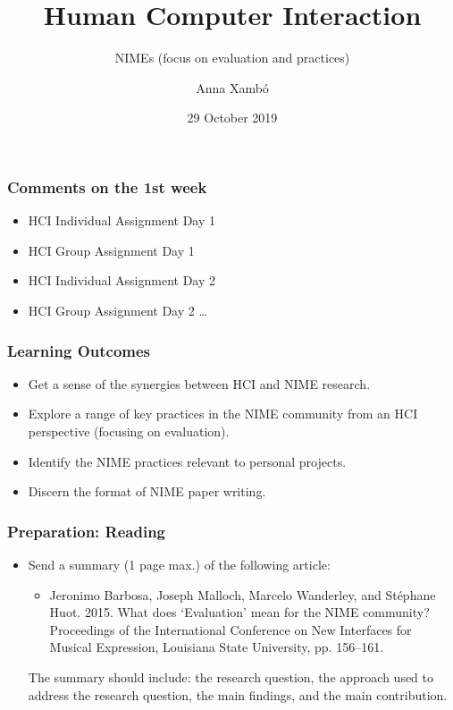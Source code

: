 \documentclass[screen, aspectratio=169]{beamer}
\title[HCI-intro]{Human Computer Interaction}
\subtitle{NIMEs (focus on evaluation and practices)}
\author[A. Xamb{\'o}]{Anna Xamb{\'o}}
\institute[NTNU]{Department of Music, NTNU}
\date{29 October 2019}
\begin{document}
\begin{frame}
  \titlepage
\end{frame}

\begin{frame}
\frametitle{Comments on the 1st week}
\begin{itemize}
\item HCI Individual Assignment Day 1
\item HCI Group Assignment Day 1
\item HCI Individual Assignment Day 2
\item HCI Group Assignment Day 2 \dots
\end{itemize}
\end{frame}
%
\begin{frame}
\frametitle{Learning Outcomes}
\begin{itemize}
\item Get a sense of the synergies between HCI and NIME research.
\item Explore a range of key practices in the NIME community from an HCI perspective (focusing on evaluation).
\item Identify the NIME practices relevant to personal projects.
\item Discern the format of NIME paper writing.
\end{itemize}
\end{frame}
%
\begin{frame}
\frametitle{Preparation: Reading}
\begin{itemize}
\item Send a summary (1 page max.) of the following article:
\begin{itemize}
\item Jeronimo Barbosa, Joseph Malloch, Marcelo Wanderley, and St\'{e}phane Huot. 2015. What does `Evaluation' mean for the NIME community? Proceedings of the International Conference on New Interfaces for Musical Expression, Louisiana State University, pp. 156--161. \cite{Barbosa.et.al.2015.evaluationNIME}\\
\end{itemize}
The summary should include: the research question, the approach used to address the research question, the main findings, and the main contribution.
\end{itemize}
\end{frame}
\end{document}
